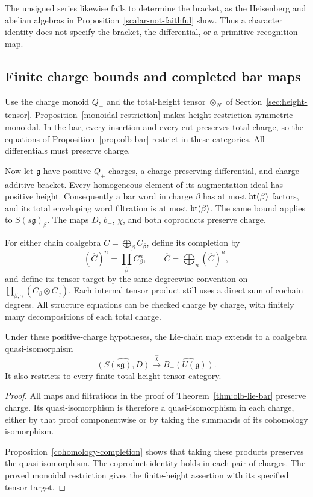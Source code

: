 The unsigned series likewise fails to determine the bracket, as the
Heisenberg and abelian algebras in Proposition~\ref{scalar-not-faithful}
show. Thus a character identity does not specify the bracket, the
differential, or a primitive recognition map.

\subsection{Finite charge bounds and completed bar maps}
\label{sec:olb-finite-completion}

Use the charge monoid $Q_+$ and the total-height tensor
$\bar\otimes_N$ of Section~\ref{sec:height-tensor}.
Proposition~\ref{monoidal-restriction} makes height restriction
symmetric monoidal. In the bar, every insertion and every cut preserves
total charge, so the equations of Proposition~\ref{prop:olb-bar}
restrict in these categories. All differentials must preserve charge.

Now let $\mathfrak g$ have positive $Q_+$-charges, a
charge-preserving differential, and charge-additive bracket.
Every homogeneous element of its augmentation ideal has positive height.
Consequently a bar word in charge $\beta$ has at most
$\operatorname{ht}(\beta)$ factors, and its total enveloping word filtration
is at most $\operatorname{ht}(\beta)$.
The same bound applies to $S(s\mathfrak g)_\beta$.
The maps $D$, $b_-$, $\chi$, and both coproducts
preserve charge.

For either chain coalgebra $C=\bigoplus_\beta C_\beta$,
define its completion by
\[
 (\widehat C)^n=\prod_\beta C_\beta^n,
 \qquad
 \widehat C=\bigoplus_n(\widehat C)^n,
\]
and define its tensor target by the same degreewise convention
on $\prod_{\beta,\gamma}(C_\beta\otimes C_\gamma)$.
Each internal tensor product still uses a direct sum of
cochain degrees.
All structure equations can be checked charge by charge,
with finitely many decompositions of each total charge.

\begin{corollary}\label{cor:olb-completed-lie-bar}
Under these positive-charge hypotheses, the Lie-chain map
extends to a coalgebra quasi-isomorphism
\[
 \widehat{(S(s\mathfrak g),D)}
 \xrightarrow{\ \widehat\chi\ }
 \widehat{B_-(U(\mathfrak g))}.
\]
It also restricts to every finite total-height tensor category.
\end{corollary}

\begin{proof}
All maps and filtrations in the proof of
Theorem~\ref{thm:olb-lie-bar} preserve charge.
Its quasi-isomorphism is therefore a quasi-isomorphism in
each charge, either by that proof componentwise or by taking
the summands of its cohomology isomorphism.

Proposition~\ref{cohomology-completion} shows that taking these
products preserves the quasi-isomorphism.
The coproduct identity holds in each pair of charges.
The proved monoidal restriction gives the finite-height
assertion with its specified tensor target.
\end{proof}

